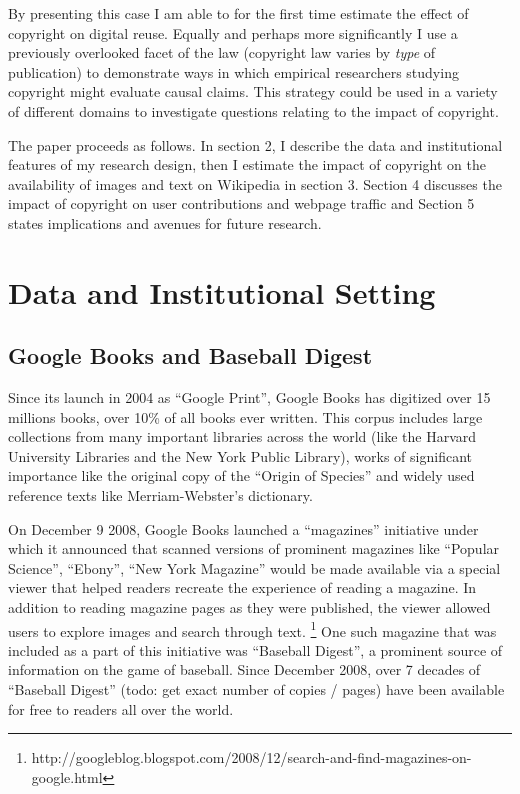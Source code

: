 \documentclass[12pt]{article}
\begin{document}
By presenting this case I am able to for the first time estimate the effect of copyright on digital reuse. Equally and perhaps more significantly I use a previously overlooked facet of the law (copyright law varies by \emph{type} of publication) to demonstrate ways in which empirical researchers studying copyright might evaluate causal claims. This strategy could be used in a variety of different domains to investigate questions relating to the impact of copyright. 

The paper proceeds as follows. In section 2, I describe the data and institutional features of my research design, then I estimate the impact of copyright on the availability of images and text on Wikipedia in section 3. Section 4 discusses the impact of copyright on user contributions and webpage traffic and Section 5 states implications and avenues for future research.


\section{Data and Institutional Setting}

\subsection{Google Books and Baseball Digest}

Since its launch in 2004 as ``Google Print'', Google Books has digitized over 15 millions books, over 10\% of all books ever written. This corpus includes large collections from many important libraries across the world (like the Harvard University Libraries and the New York Public Library), works of significant importance like the original copy of the ``Origin of Species'' and widely used reference texts like Merriam-Webster's dictionary. 

On December 9 2008, Google Books launched a ``magazines'' initiative under which it announced that scanned versions of prominent magazines like ``Popular Science'', ``Ebony'', ``New York Magazine'' would be made available via a special viewer that helped readers recreate the experience of reading a magazine. In addition to reading magazine pages as they were published, the viewer allowed users to explore images and search through text. \footnote{http://googleblog.blogspot.com/2008/12/search-and-find-magazines-on-google.html} One such magazine that was included as a part of this initiative was ``Baseball Digest'', a prominent source of information on the game of baseball. Since December 2008, over 7 decades of ``Baseball Digest'' (todo: get exact number of copies / pages) have been available for free to readers all over the world.
\end{document}

